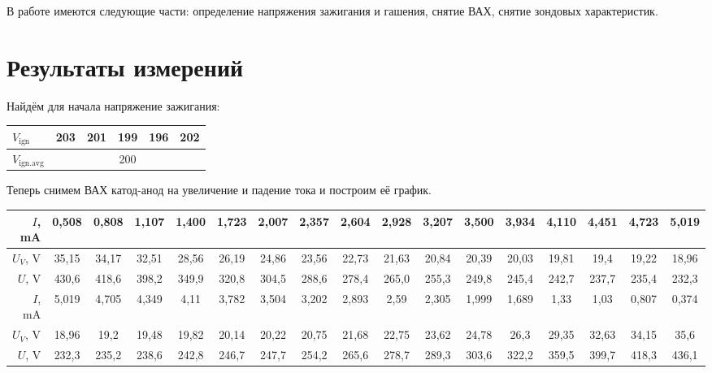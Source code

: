\documentclass[12pt, a4paper]{article}
\begin{document}
В работе имеются следующие части: определение напряжения зажигания и гашения, снятие ВАХ, снятие зондовых характеристик.

\section{Результаты измерений}

Найдём для начала напряжение зажигания:

\begin{table}[H]
\begin{tabular}{|l|lllll|}
\hline
$V_\text{ign}$     & \multicolumn{1}{l|}{203} & \multicolumn{1}{l|}{201} & \multicolumn{1}{l|}{199} & \multicolumn{1}{l|}{196} & 202 \\ \hline
$V_\text{ign.avg}$ & \multicolumn{5}{c|}{200}                                                                                        \\ \hline
\end{tabular}
\end{table}

Теперь снимем ВАХ катод-анод на увеличение и падение тока и построим её график.
\begin{table}[H]
\tiny
\begin{tabular}{|r|c|c|c|c|c|c|c|c|c|c|c|c|c|c|c|c|}
\hline
$I$, mA                         & 0,508 & 0,808 & 1,107 & 1,400 & 1,723 & 2,007 & 2,357 & 2,604 & 2,928 & 3,207 & 3,500 & 3,934 & 4,110 & 4,451 & 4,723 & 5,019 \\ \hline
\multicolumn{1}{|l|}{$U_V$, V} & 35,15 & 34,17 & 32,51 & 28,56 & 26,19 & 24,86 & 23,56 & 22,73 & 21,63 & 20,84 & 20,39 & 20,03 & 19,81 & 19,4  & 19,22 & 18,96 \\ \hline
$U$, V                          & 430,6 & 418,6 & 398,2 & 349,9 & 320,8 & 304,5 & 288,6 & 278,4 & 265,0 & 255,3 & 249,8 & 245,4 & 242,7 & 237,7 & 235,4 & 232,3 \\ \hline
$I$, mA                         & 5,019 & 4,705 & 4,349 & 4,11  & 3,782 & 3,504 & 3,202 & 2,893 & 2,59  & 2,305 & 1,999 & 1,689 & 1,33  & 1,03  & 0,807 & 0,374 \\ \hline
\multicolumn{1}{|l|}{$U_V$, V} & 18,96 & 19,2  & 19,48 & 19,82 & 20,14 & 20,22 & 20,75 & 21,68 & 22,75 & 23,62 & 24,78 & 26,3  & 29,35 & 32,63 & 34,15 & 35,6  \\ \hline
$U$, V                          & 232,3 & 235,2 & 238,6 & 242,8 & 246,7 & 247,7 & 254,2 & 265,6 & 278,7 & 289,3 & 303,6 & 322,2 & 359,5 & 399,7 & 418,3 & 436,1 \\ \hline
\end{tabular}
\end{table}
\end{document}
